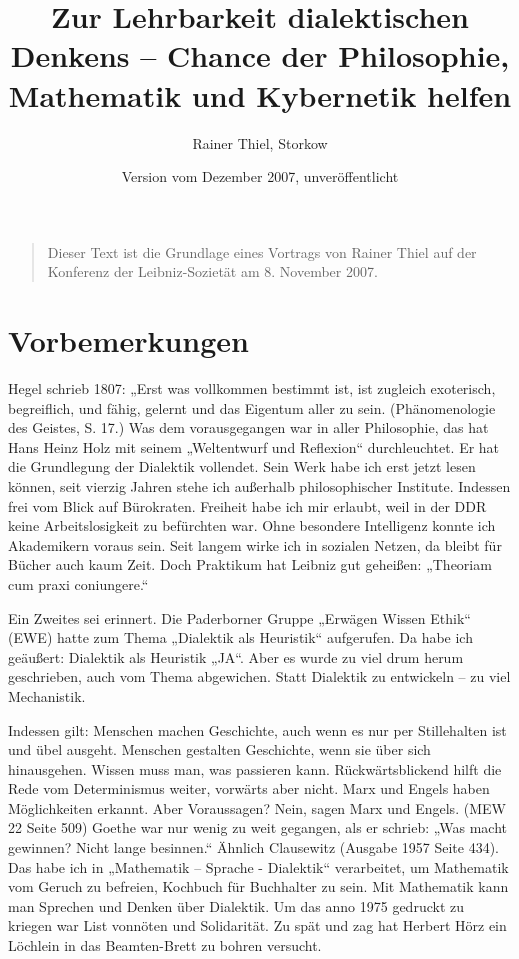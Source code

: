 \documentclass[11pt,a4paper]{article}
\title{Zur Lehrbarkeit dialektischen Denkens – Chance der
  Philosophie, Mathematik und Kybernetik helfen}
\author{Rainer Thiel, Storkow}
\date{Version vom Dezember 2007, unveröffentlicht}
\begin{document}
\maketitle

\begin{quote}
  Dieser Text ist die Grundlage eines Vortrags von Rainer Thiel auf der
  Konferenz der Leibniz-Sozietät am 8. November 2007.
\end{quote}

\section{Vorbemerkungen}

Hegel schrieb 1807: „Erst was vollkommen bestimmt ist, ist zugleich
exoterisch, begreiflich, und fähig, gelernt und das Eigentum aller zu sein.
(Phänomenologie des Geistes, S. 17.) Was dem vorausgegangen war in aller
Philosophie, das hat Hans Heinz Holz mit seinem „Weltentwurf und Reflexion“
durchleuchtet. Er hat die Grundlegung der Dialektik vollendet. Sein Werk habe
ich erst jetzt lesen können, seit vierzig Jahren stehe ich außerhalb
philosophischer Institute. Indessen frei vom Blick auf Bürokraten. Freiheit
habe ich mir erlaubt, weil in der DDR keine Arbeitslosigkeit zu befürchten
war. Ohne besondere Intelligenz konnte ich Akademikern voraus sein. Seit
langem wirke ich in sozialen Netzen, da bleibt für Bücher auch kaum Zeit. Doch
Praktikum hat Leibniz gut geheißen: „Theoriam cum praxi coniungere.“

Ein Zweites sei erinnert. Die Paderborner Gruppe „Erwägen Wissen Ethik“ (EWE)
hatte zum Thema „Dialektik als Heuristik“ aufgerufen. Da habe ich geäußert:
Dialektik als Heuristik „JA“. Aber es wurde zu viel drum herum geschrieben,
auch vom Thema abgewichen. Statt Dialektik zu entwickeln – zu viel
Mechanistik.

Indessen gilt: Menschen machen Geschichte, auch wenn es nur per Stillehalten
ist und übel ausgeht. Menschen gestalten Geschichte, wenn sie über sich
hinausgehen. Wissen muss man, was passieren kann. Rückwärtsblickend hilft die
Rede vom Determinismus weiter, vorwärts aber nicht. Marx und Engels haben
Möglichkeiten erkannt. Aber Voraussagen? Nein, sagen Marx und Engels. (MEW 22
Seite 509) Goethe war nur wenig zu weit gegangen, als er schrieb: „Was macht
gewinnen? Nicht lange besinnen.“ Ähnlich Clausewitz (Ausgabe 1957 Seite 434).
Das habe ich in „Mathematik – Sprache - Dialektik“ verarbeitet, um Mathematik
vom Geruch zu befreien, Kochbuch für Buchhalter zu sein. Mit Mathematik kann
man Sprechen und Denken über Dialektik. Um das anno 1975 gedruckt zu kriegen
war List vonnöten und Solidarität. Zu spät und zag hat Herbert Hörz ein
Löchlein in das Beamten-Brett zu bohren versucht.
\end{document}
